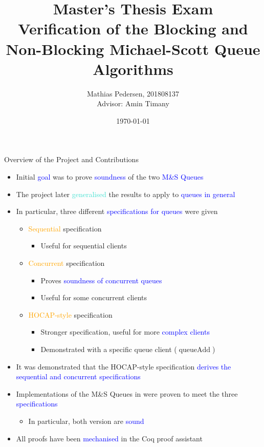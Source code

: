 \documentclass[9pt,xcolor={dvipsnames}]{beamer}
\title{Master's Thesis Exam\\
Verification of the Blocking and Non-Blocking Michael-Scott Queue Algorithms}
\author{
  Mathias Pedersen, 201808137 \texorpdfstring{\\}{with}
  {\small Advisor: Amin Timany}
}
\institute{Aarhus University}
\date{\today}
\newcommand{\queueAdd}{\operatorname{queueAdd}}
\newcommand{\msq}{M\&S Queue}
\begin{document}
\frame{\titlepage}


\begin{frame}{Overview of the Project and Contributions}
  \begin{itemize}
    \item Initial \textcolor{blue}{goal} was to prove \textcolor{blue}{soundness} of the two \textcolor{blue}{\msq{}s}
    \item The project later \textcolor{Turquoise}{generalised} the results to apply to \textcolor{blue}{queues in general}
    \item In particular, three different \textcolor{blue}{specifications for queues} were given
    \begin{itemize}
      \item \textcolor{orange}{Sequential} specification
        \begin{itemize}
          \item Useful for sequential clients
        \end{itemize}
      \item \textcolor{orange}{Concurrent} specification
        \begin{itemize}
          \item Proves \textcolor{blue}{soundness of concurrent queues}
          \item Useful for some concurrent clients
        \end{itemize}
      \item \textcolor{orange}{HOCAP-style} specification
        \begin{itemize}
          \item Stronger specification, useful for more \textcolor{blue}{complex clients}
          \item Demonstrated with a specific queue client ($\queueAdd$)
        \end{itemize}
    \end{itemize}
    \item It was demonstrated that the HOCAP-style specification \textcolor{blue}{derives the sequential and concurrent specifications}
    \item \textcolor{ExampleColour}{Implementations} of the \msq{}s in \textcolor{blue}{\heaplang{}} were proven to meet the three \textcolor{blue}{specifications}
      \begin{itemize}
        \item In particular, both version are \textcolor{blue}{sound}
      \end{itemize}
    \item All proofs have been \textcolor{blue}{mechanised} in the \textcolor[RGB]{199,154,115}{Coq} \textcolor[RGB]{222,196,152}{proof assistant}
  \end{itemize}
\end{frame}
\end{document}
